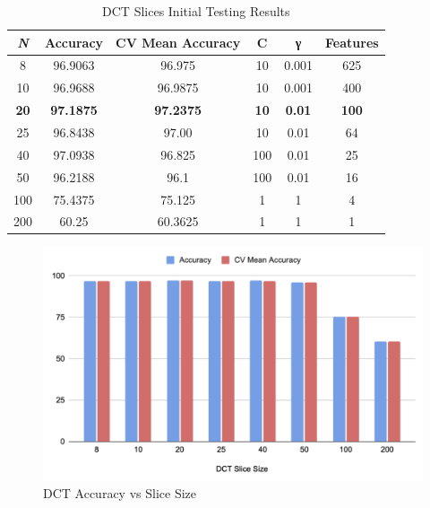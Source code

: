 \documentclass[journal]{./IEEE/IEEEtran}
\begin{document}
\begin{table}[H]
\centering
\begin{tabular}{|c|c|c|c|c|c|}
\hline
\textit{\textbf{N}} & Accuracy         & CV Mean Accuracy & C           & γ             & Features     \\ \hline
8                   & 96.9063          & 96.975           & 10          & 0.001         & 625          \\ \hline
10                  & 96.9688          & 96.9875          & 10          & 0.001         & 400          \\ \hline
\textbf{20}                  & \textbf{97.1875} & \textbf{97.2375} & \textbf{10} & \textbf{0.01} & \textbf{100} \\ \hline
25                  & 96.8438          & 97.00            & 10          & 0.01          & 64           \\ \hline
40                  & 97.0938          & 96.825           & 100         & 0.01          & 25           \\ \hline
50                  & 96.2188          & 96.1             & 100         & 0.01          & 16           \\ \hline
100                 & 75.4375          & 75.125           & 1           & 1             & 4            \\ \hline
200                 & 60.25            & 60.3625          & 1           & 1             & 1            \\ \hline
\end{tabular}
\caption{DCT Slices Initial Testing Results}
\end{table}

\begin{figure}[!ht]
    \centering
    \includegraphics{imgs/Acc_slize.png}
    \caption{DCT Accuracy vs Slice Size}
    \label{fig:enter-label}
\end{figure}
\end{document}

